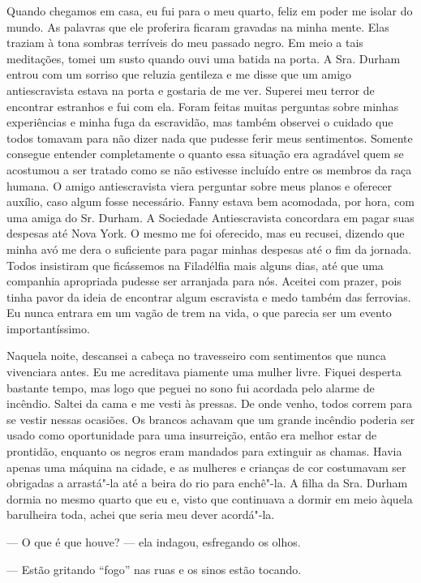 Quando chegamos em casa, eu fui para o
meu quarto, feliz em poder me isolar do mundo. As palavras que ele
proferira ficaram gravadas na minha mente. Elas traziam à tona sombras
terríveis do meu passado negro. Em meio a tais meditações, tomei um
susto quando ouvi uma batida na porta. A Sra. Durham entrou com um
sorriso que reluzia gentileza e me disse que um amigo antiescravista
estava na porta e gostaria de me ver. Superei meu terror de encontrar
estranhos e fui com ela. Foram feitas muitas perguntas sobre minhas
experiências e minha fuga da escravidão, mas também observei o cuidado
que todos tomavam para não dizer nada que pudesse ferir meus
sentimentos. Somente consegue entender completamente o quanto essa
situação era agradável quem se acostumou a ser tratado como se não
estivesse incluído entre os membros da raça humana. O amigo
antiescravista viera perguntar sobre meus planos e oferecer auxílio,
caso algum fosse necessário. Fanny estava bem acomodada, por hora, com
uma amiga do Sr. Durham. A Sociedade Antiescravista concordara em pagar
suas despesas até Nova York. O mesmo me foi oferecido, mas eu recusei,
dizendo que minha avó me dera o suficiente para pagar minhas despesas
até o fim da jornada. Todos insistiram que ficássemos na Filadélfia mais
alguns dias, até que uma companhia apropriada pudesse ser arranjada para
nós. Aceitei com prazer, pois tinha pavor da ideia de encontrar algum
escravista e medo também das ferrovias. Eu nunca entrara em um vagão de
trem na vida, o que parecia ser um evento importantíssimo.

Naquela noite, descansei a cabeça no
travesseiro com sentimentos que nunca vivenciara antes. Eu me acreditava
piamente uma mulher livre. Fiquei desperta bastante tempo, mas logo que
peguei no sono fui acordada pelo alarme de incêndio. Saltei da cama e me
vesti às pressas. De onde venho, todos correm para se vestir nessas
ocasiões. Os brancos achavam que um grande incêndio poderia ser usado
como oportunidade para uma insurreição, então era melhor estar de
prontidão, enquanto os negros eram mandados para extinguir as chamas.
Havia apenas uma máquina na cidade, e as mulheres e crianças de cor
costumavam ser obrigadas a arrastá"-la até a beira do rio para enchê"-la.
A filha da Sra. Durham dormia no mesmo quarto que eu e, visto que
continuava a dormir em meio àquela barulheira toda, achei que seria meu
dever acordá"-la.

--- O que é que houve? --- ela indagou, esfregando os olhos.

--- Estão gritando ``fogo'' nas ruas e
os sinos estão tocando.

